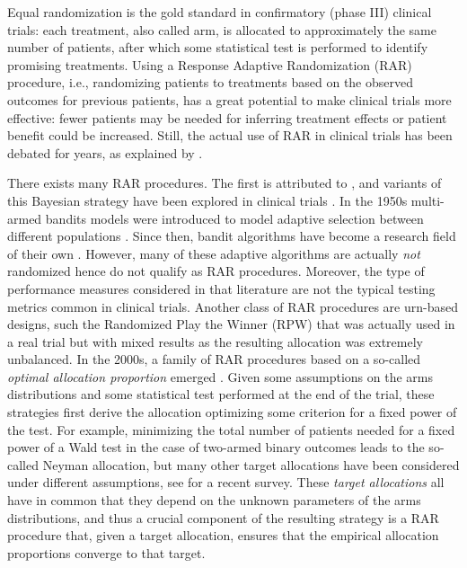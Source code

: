 Equal randomization is the gold standard in confirmatory (phase III) clinical trials: each treatment, also called arm, is allocated to approximately the same number of patients, after which some statistical test is performed to identify promising treatments. Using a Response Adaptive Randomization (RAR) procedure, i.e., randomizing patients to treatments based on the observed outcomes for previous patients, has a great potential to make clinical trials more effective: fewer patients may be needed for inferring treatment effects or patient benefit could be increased. Still, the actual use of RAR in clinical trials has been debated for years, as explained  by \cite{Villar23Review}.

There exists many RAR procedures. The first is attributed to \citep{Thompson33}, and variants of this Bayesian strategy have been explored in clinical trials \citep{Thall07}. In the 1950s multi-armed bandits models were introduced to model adaptive selection between different populations \citep{Robbins52Freq} . Since then, bandit algorithms have become a research field of their own \citep{BanditBook}. However, many of these adaptive algorithms are actually \emph{not} randomized hence do not qualify as RAR procedures. Moreover, the type of performance measures considered in that literature are not the typical testing metrics common in clinical trials. Another class of RAR procedures are urn-based designs, such the Randomized Play the Winner (RPW) \citep{WeiDurham78RPW} that was actually used in a real trial \citep{Bartlett85ECMO} but with mixed results as the resulting allocation was extremely unbalanced. In the 2000s, a family of RAR procedures based on a so-called \emph{optimal allocation proportion} emerged \citep{Rosenberger01Opt}. Given some assumptions on the arms distributions and some statistical test performed at the end of the trial, these strategies first derive the allocation optimizing some criterion for a fixed power of the test. For example, minimizing the total number of patients needed for a fixed power of a Wald test in the case of two-armed binary outcomes leads to the so-called Neyman allocation, but many other target allocations have been considered under different assumptions, see \citep{pin2024response} for a recent survey. These \emph{target allocations} all have in common that they depend on the unknown parameters of the arms distributions, and thus a crucial component of the resulting strategy is a RAR procedure that, given a target allocation, ensures that the empirical allocation proportions converge to that target.

